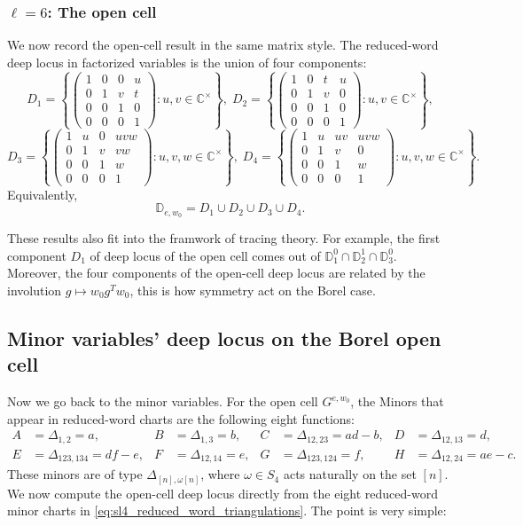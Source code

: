 \documentclass[12pt]{amsart}
\newcommand{\C}{\mathbb C}
\newcommand{\D}{\mathbb D}
\theoremstyle{plain}
\theoremstyle{definition}
\theoremstyle{remark}
\begin{document}
\subsubsection*{$\ell=6$: The open cell}

We now record the open-cell result in the same matrix style.  The reduced-word deep locus in factorized variables is the union of four components:
\[
D_1=
\left\{
\begin{pmatrix}
1&0&0&u\\
0&1&v&t\\
0&0&1&0\\
0&0&0&1
\end{pmatrix}
:u,v\in\C^{\times}
\right\},
\;
D_2=
\left\{
\begin{pmatrix}
1&0&t&u\\
0&1&v&0\\
0&0&1&0\\
0&0&0&1
\end{pmatrix}
:u,v\in\C^{\times}
\right\},
\]
\[
D_3=
\left\{
\begin{pmatrix}
1&u&0&uvw\\
0&1&v&vw\\
0&0&1&w\\
0&0&0&1
\end{pmatrix}
:u,v,w\in\C^{\times}
\right\},
\;
D_4=
\left\{
\begin{pmatrix}
1&u&uv&uvw\\
0&1&v&0\\
0&0&1&w\\
0&0&0&1
\end{pmatrix}
:u,v,w\in\C^{\times}
\right\}.
\]
Equivalently,
\[
\D_{e,w_0}=D_1\cup D_2\cup D_3\cup D_4.
\]

These results also fit into the framwork of tracing theory. For example, the first component $D_1$ of deep locus of the open cell comes out of $\D_{1}^{0} \cap \D_{2}^{1} \cap \D_{3}^{0}$. Moreover, the four components of the open-cell deep locus are related by the involution $g\mapsto w_0g^Tw_0$, this is how symmetry act on the Borel case.



\subsection{\texorpdfstring{Minor variables' deep locus on the Borel open cell}{Minor variables' deep locus on the Borel open cell}}

Now we go back to the minor variables. For the open cell $G^{e,w_0}$, the Minors that appear in reduced-word charts are the following eight functions:
\begin{align*}
A&=\Delta_{1,2}=a,
&
B&=\Delta_{1,3}=b,
&
C&=\Delta_{12,23}=ad-b,
&
D&=\Delta_{12,13}=d,\\
E&=\Delta_{123,134}=df-e,
&
F&=\Delta_{12,14}=e,
&
G&=\Delta_{123,124}=f,
&
H&=\Delta_{12,24}=ae-c.
\end{align*}
These minors are of type $\Delta_{[n],\omega[n]}$, where $\omega \in S_4$ acts naturally on the set $[n]$.  We now compute the open-cell deep locus directly from the eight reduced-word minor charts in \eqref{eq:sl4_reduced_word_triangulations}.  The point is very simple:
\end{document}
